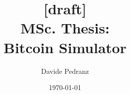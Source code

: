 \documentclass[11pt, a4paper]{report}
\title{[draft]\\MSc. Thesis:\\Bitcoin Simulator}
\author{Davide Pedranz}
\date{\today}
\begin{document}
\begin{titlepage}
	\maketitle
\end{titlepage}

\tableofcontents

% 



% 
% 
% 

\printbibliography
\end{document}
